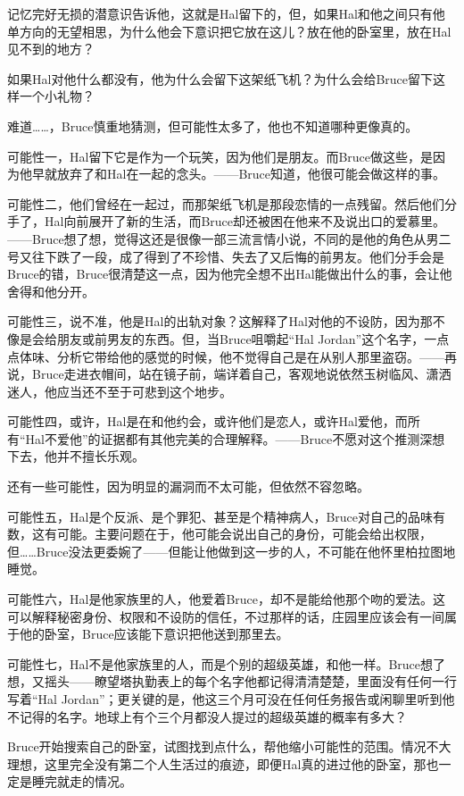 \documentclass[../main.tex]{subfiles}
\begin{document}
记忆完好无损的潜意识告诉他，这就是Hal留下的，但，如果Hal和他之间只有他单方向的无望相思，为什么他会下意识把它放在这儿？放在他的卧室里，放在Hal见不到的地方？

如果Hal对他什么都没有，他为什么会留下这架纸飞机？为什么会给Bruce留下这样一个小礼物？

难道\ldots\ldots，Bruce慎重地猜测，但可能性太多了，他也不知道哪种更像真的。

可能性一，Hal留下它是作为一个玩笑，因为他们是朋友。而Bruce做这些，是因为他早就放弃了和Hal在一起的念头。——Bruce知道，他很可能会做这样的事。

可能性二，他们曾经在一起过，而那架纸飞机是那段恋情的一点残留。然后他们分手了，Hal向前展开了新的生活，而Bruce却还被困在他来不及说出口的爱慕里。——Bruce想了想，觉得这还是很像一部三流言情小说，不同的是他的角色从男二号又往下跌了一段，成了得到了不珍惜、失去了又后悔的前男友。他们分手会是Bruce的错，Bruce很清楚这一点，因为他完全想不出Hal能做出什么的事，会让他舍得和他分开。

可能性三，说不准，他是Hal的出轨对象？这解释了Hal对他的不设防，因为那不像是会给朋友或前男友的东西。但，当Bruce咀嚼起“Hal
Jordan”这个名字，一点点体味、分析它带给他的感觉的时候，他不觉得自己是在从别人那里盗窃。——再说，Bruce走进衣帽间，站在镜子前，端详着自己，客观地说依然玉树临风、潇洒迷人，他应当还不至于可悲到这个地步。

可能性四，或许，Hal是在和他约会，或许他们是恋人，或许Hal爱他，而所有“Hal不爱他”的证据都有其他完美的合理解释。——Bruce不愿对这个推测深想下去，他并不擅长乐观。

还有一些可能性，因为明显的漏洞而不太可能，但依然不容忽略。

可能性五，Hal是个反派、是个罪犯、甚至是个精神病人，Bruce对自己的品味有数，这有可能。主要问题在于，他可能会说出自己的身份，可能会给出权限，但\ldots\ldots Bruce没法更委婉了——但能让他做到这一步的人，不可能在他怀里柏拉图地睡觉。

可能性六，Hal是他家族里的人，他爱着Bruce，却不是能给他那个吻的爱法。这可以解释秘密身份、权限和不设防的信任，不过那样的话，庄园里应该会有一间属于他的卧室，Bruce应该能下意识把他送到那里去。

可能性七，Hal不是他家族里的人，而是个别的超级英雄，和他一样。Bruce想了想，又摇头——瞭望塔执勤表上的每个名字他都记得清清楚楚，里面没有任何一行写着“Hal
Jordan”；更关键的是，他这三个月可没在任何任务报告或闲聊里听到他不记得的名字。地球上有个三个月都没人提过的超级英雄的概率有多大？

Bruce开始搜索自己的卧室，试图找到点什么，帮他缩小可能性的范围。情况不大理想，这里完全没有第二个人生活过的痕迹，即便Hal真的进过他的卧室，那也一定是睡完就走的情况。
\end{document}
